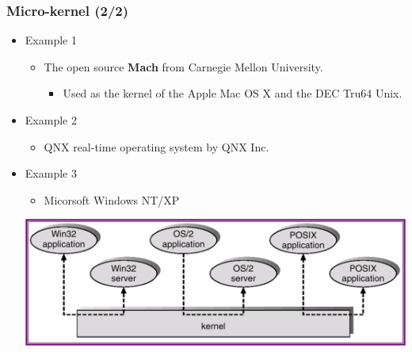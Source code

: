 \documentclass[CJKutf8,xcolor=pdftex,dvipsnames,table]{beamer}
\begin{document}
\begin{CJK*}{UTF8}{song}
  \begin{frame}
    \frametitle{Micro-kernel (2/2)} \pause
    \begin{itemize}
    \item{Example 1} \pause
      \begin{itemize}
      \item{The open source \textbf{Mach} from Carnegie Mellon University.} \pause
        \begin{itemize}
        \item{Used as the kernel of the Apple Mac OS X and the DEC Tru64 Unix.} \pause
        \end{itemize}
      \end{itemize}
    \item{Example 2} \pause
      \begin{itemize}
      \item{QNX real-time operating system by QNX Inc.} \pause
      \end{itemize}
    \item{Example 3} \pause
      \begin{itemize}
      \item{Micorsoft Windows NT/XP} \pause
      \end{itemize}
      \begin{center}
        \includegraphics[scale=.45]{v6f3-10}
      \end{center}
    \end{itemize}
  \end{frame}
  

\end{CJK*}
\end{document}
